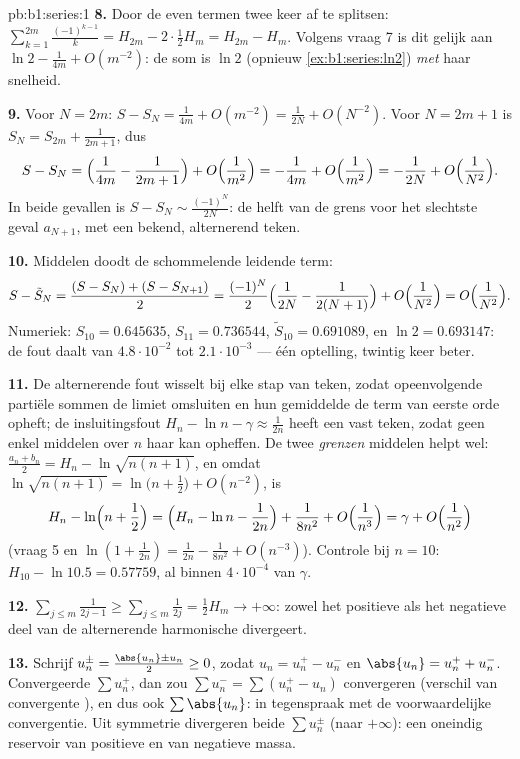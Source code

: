 \begin{solution}{pb:b1:series:1}
\textbf{8.} Door de even termen twee keer af te splitsen:
$\sum_{k=1}^{2m}\frac{(-1)^{k-1}}{k} = H_{2m} - 2\cdot\frac12
H_m = H_{2m} - H_m$. Volgens vraag 7 is dit gelijk aan $\ln 2 -
\frac{1}{4m} + O(m^{-2})$: de som is $\ln 2$
(opnieuw \cref{ex:b1:series:ln2}) \emph{met} haar snelheid.

\textbf{9.} Voor $N = 2m$: $S - S_N = \frac{1}{4m} + O(m^{-2}) =
\frac{1}{2N} + O(N^{-2})$. Voor $N = 2m + 1$ is $S_{N} = S_{2m} +
\frac{1}{2m+1}$, dus
\[
S - S_N = \Bigl(\frac{1}{4m} - \frac{1}{2m+1}\Bigr) +
O\Bigl(\frac{1}{m^2}\Bigr)
= -\frac{1}{4m} + O\Bigl(\frac{1}{m^2}\Bigr)
= -\frac{1}{2N} + O\Bigl(\frac{1}{N^2}\Bigr).
\]
In beide gevallen is $S - S_N \sim \frac{(-1)^N}{2N}$: de helft
van de grens voor het slechtste geval $a_{N+1}$, met een bekend,
alternerend teken.

\textbf{10.} Middelen doodt de schommelende leidende term:
\[
S - \tilde S_N = \frac{(S - S_N) + (S - S_{N+1})}{2}
= \frac{(-1)^N}{2}\Bigl(\frac{1}{2N} - \frac{1}{2(N+1)}\Bigr)
+ O\Bigl(\frac{1}{N^2}\Bigr) = O\Bigl(\frac{1}{N^2}\Bigr).
\]
Numeriek: $S_{10} = 0.645635$, $S_{11} = 0.736544$, $\tilde
S_{10} = 0.691089$, en $\ln 2 = 0.693147$: de fout daalt van
$4.8\cdot10^{-2}$ tot $2.1\cdot10^{-3}$ --- één optelling,
twintig keer beter.

\textbf{11.} De alternerende fout wisselt bij elke stap van
teken, zodat opeenvolgende partiële sommen de limiet omsluiten en
hun gemiddelde de term van eerste orde opheft; de insluitingsfout
$H_n - \ln n - \gamma \approx \frac{1}{2n}$ heeft een vast teken,
zodat geen enkel middelen over $n$ haar kan opheffen. De twee
\emph{grenzen} middelen helpt wel: $\frac{a_n + b_n}{2} = H_n -
\ln\sqrt{n(n+1)}$, en omdat $\ln\sqrt{n(n+1)} = \ln\bigl(n +
\frac12\bigr) + O(n^{-2})$, is
\[
H_n - \ln\Bigl(n + \frac12\Bigr)
= \Bigl(H_n - \ln n - \frac{1}{2n}\Bigr) + \frac{1}{8n^2} +
O\Bigl(\frac{1}{n^3}\Bigr) = \gamma + O\Bigl(\frac{1}{n^2}\Bigr)
\]
(vraag 5 en $\ln(1 + \frac{1}{2n}) = \frac{1}{2n} -
\frac{1}{8n^2} + O(n^{-3})$). Controle bij $n = 10$: $H_{10} -
\ln 10.5 = 0.57759$, al binnen $4\cdot10^{-4}$ van $\gamma$.

\textbf{12.} $\sum_{j\leq m} \frac{1}{2j-1} \geq \sum_{j \leq m}
\frac{1}{2j} = \frac12 H_m \to +\infty$: zowel het positieve als
het negatieve deel van de alternerende harmonische 
divergeert.

\textbf{13.} Schrijf $u_n^\pm = \frac{\abs{u_n} \pm u_n}{2} \geq
0$, zodat $u_n = u_n^+ - u_n^-$ en $\abs{u_n} = u_n^+ + u_n^-$.
Convergeerde $\sum u_n^+$, dan zou $\sum u_n^- = \sum (u_n^+ -
u_n)$ convergeren (verschil van convergente ), en dus ook
$\sum \abs{u_n}$: in tegenspraak met de voorwaardelijke
convergentie. Uit symmetrie divergeren beide $\sum u_n^\pm$ (naar
$+\infty$): een oneindig reservoir van positieve en van negatieve
massa.


\end{solution}
